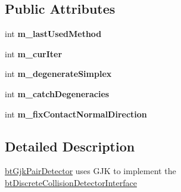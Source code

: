 \subsection*{Public Attributes}
\begin{DoxyCompactItemize}
\item 
\hypertarget{classbt_gjk_pair_detector_a54ad1723f4470c39849f2367d235bd63}{int {\bfseries m\+\_\+last\+Used\+Method}}\label{classbt_gjk_pair_detector_a54ad1723f4470c39849f2367d235bd63}

\item 
\hypertarget{classbt_gjk_pair_detector_ac78c8065175f8c0082ebd95f94607e20}{int {\bfseries m\+\_\+cur\+Iter}}\label{classbt_gjk_pair_detector_ac78c8065175f8c0082ebd95f94607e20}

\item 
\hypertarget{classbt_gjk_pair_detector_a85d196506ed41900a4bb834af461d41d}{int {\bfseries m\+\_\+degenerate\+Simplex}}\label{classbt_gjk_pair_detector_a85d196506ed41900a4bb834af461d41d}

\item 
\hypertarget{classbt_gjk_pair_detector_a47b5f1df3aa7d5ce044b56d7ced46859}{int {\bfseries m\+\_\+catch\+Degeneracies}}\label{classbt_gjk_pair_detector_a47b5f1df3aa7d5ce044b56d7ced46859}

\item 
\hypertarget{classbt_gjk_pair_detector_a5d0d6dc51db85ed7088638aca4044cef}{int {\bfseries m\+\_\+fix\+Contact\+Normal\+Direction}}\label{classbt_gjk_pair_detector_a5d0d6dc51db85ed7088638aca4044cef}

\end{DoxyCompactItemize}


\subsection{Detailed Description}
\hyperlink{classbt_gjk_pair_detector}{bt\+Gjk\+Pair\+Detector} uses G\+J\+K to implement the \hyperlink{structbt_discrete_collision_detector_interface}{bt\+Discrete\+Collision\+Detector\+Interface} 

